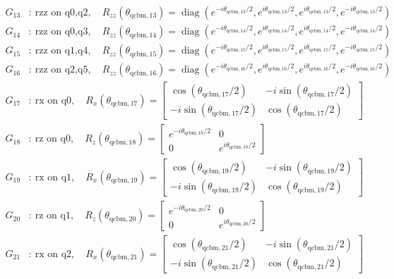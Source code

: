 \begin{align*}
G_{13}&:\ \text{rzz on q0,q2},\quad R_{zz}(\theta_{\mathrm{qcbm},13})=\operatorname{diag}(e^{-i\theta_{\mathrm{qcbm},13}/2},e^{i\theta_{\mathrm{qcbm},13}/2},e^{i\theta_{\mathrm{qcbm},13}/2},e^{-i\theta_{\mathrm{qcbm},13}/2})\\
G_{14}&:\ \text{rzz on q0,q3},\quad R_{zz}(\theta_{\mathrm{qcbm},14})=\operatorname{diag}(e^{-i\theta_{\mathrm{qcbm},14}/2},e^{i\theta_{\mathrm{qcbm},14}/2},e^{i\theta_{\mathrm{qcbm},14}/2},e^{-i\theta_{\mathrm{qcbm},14}/2})\\
G_{15}&:\ \text{rzz on q1,q4},\quad R_{zz}(\theta_{\mathrm{qcbm},15})=\operatorname{diag}(e^{-i\theta_{\mathrm{qcbm},15}/2},e^{i\theta_{\mathrm{qcbm},15}/2},e^{i\theta_{\mathrm{qcbm},15}/2},e^{-i\theta_{\mathrm{qcbm},15}/2})\\
G_{16}&:\ \text{rzz on q2,q5},\quad R_{zz}(\theta_{\mathrm{qcbm},16})=\operatorname{diag}(e^{-i\theta_{\mathrm{qcbm},16}/2},e^{i\theta_{\mathrm{qcbm},16}/2},e^{i\theta_{\mathrm{qcbm},16}/2},e^{-i\theta_{\mathrm{qcbm},16}/2})\\
G_{17}&:\ \text{rx on q0},\quad R_x(\theta_{\mathrm{qcbm},17})=\begin{bmatrix}\cos(\theta_{\mathrm{qcbm},17}/2)&-i\sin(\theta_{\mathrm{qcbm},17}/2)\\-i\sin(\theta_{\mathrm{qcbm},17}/2)&\cos(\theta_{\mathrm{qcbm},17}/2)\end{bmatrix}\\
G_{18}&:\ \text{rz on q0},\quad R_z(\theta_{\mathrm{qcbm},18})=\begin{bmatrix}e^{-i\theta_{\mathrm{qcbm},18}/2}&0\\0&e^{i\theta_{\mathrm{qcbm},18}/2}\end{bmatrix}\\
G_{19}&:\ \text{rx on q1},\quad R_x(\theta_{\mathrm{qcbm},19})=\begin{bmatrix}\cos(\theta_{\mathrm{qcbm},19}/2)&-i\sin(\theta_{\mathrm{qcbm},19}/2)\\-i\sin(\theta_{\mathrm{qcbm},19}/2)&\cos(\theta_{\mathrm{qcbm},19}/2)\end{bmatrix}\\
G_{20}&:\ \text{rz on q1},\quad R_z(\theta_{\mathrm{qcbm},20})=\begin{bmatrix}e^{-i\theta_{\mathrm{qcbm},20}/2}&0\\0&e^{i\theta_{\mathrm{qcbm},20}/2}\end{bmatrix}\\
G_{21}&:\ \text{rx on q2},\quad R_x(\theta_{\mathrm{qcbm},21})=\begin{bmatrix}\cos(\theta_{\mathrm{qcbm},21}/2)&-i\sin(\theta_{\mathrm{qcbm},21}/2)\\-i\sin(\theta_{\mathrm{qcbm},21}/2)&\cos(\theta_{\mathrm{qcbm},21}/2)\end{bmatrix}\\

\end{align*}
